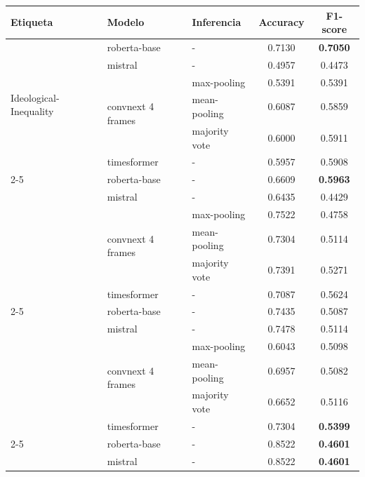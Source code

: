 \begin{table}[H]
    \centering
    \begin{tabular}{lllcc}
        \toprule
        \textbf{Etiqueta} & \textbf{Modelo} & \textbf{Inferencia} & \textbf{Accuracy} & \textbf{F1-score} \\
        \midrule        
        \multirow{6}{*}{Ideological-Inequality} 
            & roberta-base & - & 0.7130 & \textbf{0.7050} \\
            & mistral & - & 0.4957 & 0.4473 \\
            & \multirow{3}{*}{convnext 4 frames} 
                & max-pooling & 0.5391 & 0.5391 \\
            &   & mean-pooling  & 0.6087 & 0.5859 \\
            &   & majority vote  & 0.6000 & 0.5911 \\
            & timesformer & - & 0.5957 & 0.5908 \\
        \cmidrule{2-5}
        \multirow{6}{*}{Stereotyping-Dominance} 
            & roberta-base & - & 0.6609 & \textbf{0.5963} \\
            & mistral & - & 0.6435 & 0.4429 \\            
            & \multirow{3}{*}{convnext 4 frames} 
                & max-pooling & 0.7522 & 0.4758 \\
            &   & mean-pooling  & 0.7304 & 0.5114 \\
            &   & majority vote  & 0.7391 & 0.5271 \\
            & timesformer & - & 0.7087 & 0.5624 \\
        \cmidrule{2-5}
        \multirow{6}{*}{Objectification} 
            & roberta-base & - & 0.7435 & 0.5087 \\
            & mistral & - & 0.7478 & 0.5114 \\            
            & \multirow{3}{*}{convnext 4 frames} 
                & max-pooling & 0.6043 & 0.5098 \\
            &   & mean-pooling  & 0.6957 & 0.5082 \\
            &   & majority vote  & 0.6652 & 0.5116 \\
            & timesformer & - & 0.7304 & \textbf{0.5399} \\
        \cmidrule{2-5}
        \multirow{6}{*}{Sexual Violence} 
            & roberta-base & - & 0.8522 & \textbf{0.4601} \\
            & mistral & - & 0.8522 & \textbf{0.4601} \\            

\end{tabular}
\end{table}
